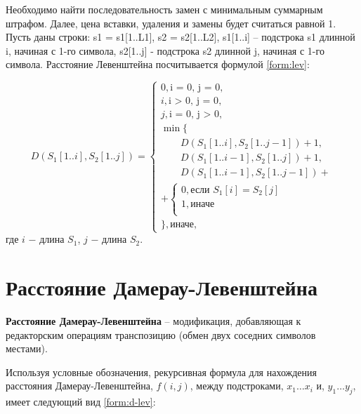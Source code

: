 Необходимо найти последовательность замен с минимальным суммарным штрафом.
Далее, цена вставки, удаления и замены будет считаться равной 1.
Пусть даны строки: s1 = s1[1..L1], s2 = s2[1..L2], s1[1..i] -- подстрока s1 длинной i, начиная с 1-го символа, s2[1..j] - подстрока s2 длинной j, начиная с 1-го символа.
Расстояние Левенштейна посчитывается формулой \ref{form:lev}:

\begin{equation}
	\label{form:lev}
	D(S_1[1..i], S_2[1..j]) = 
	\begin{cases}
	  0, \text{i = 0, j = 0},\\
	  i, \text{i > 0, j = 0},\\
	  j, \text{i = 0, j > 0},\\
	  \min \lbrace \\
		\qquad D(S_1[1..i], S_2[1..j - 1]) + 1,\\
		\qquad D(S_1[1..i - 1], S_2[1..j]) + 1,\\
		\qquad D(S_1[1..i - 1], S_2[1..j - 1]) +\\ 
		+
		\begin{cases}
		  0, \text{если }S_1[i] = S_2[j]\\
		  1, \text{иначе}\\
		\end{cases}\\
	  \rbrace, \text{иначе,}
	\end{cases}
\end{equation}
где $i$ $-$ длина $S_1$, $j$ $-$ длина $S_2$.

\section{Расстояние Дамерау-Левенштейна}

\textbf{Расстояние Дамерау-Левенштейна} -- модификация, добавляющая к редакторским операциям транспозицию (обмен двух соседних символов местами).

Используя условные обозначения, рекурсивная формула для нахождения расстояния Дамерау-Левенштейна, $f(i, j)$, между подстроками, $x_1 \dots x_i$ и, $y_1 \dots y_j$, имеет следующий вид \ref{form:d-lev}:

